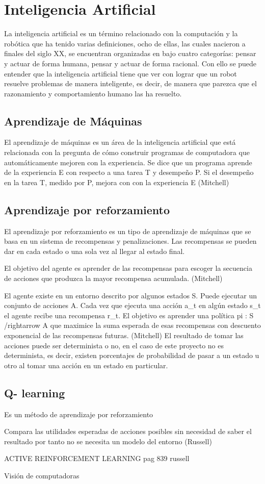 \section{Inteligencia Artificial} \label{sect:Inteligencia_Artificial}
La inteligencia artificial es un término relacionado con la computación y la robótica que ha tenido varias definiciones, ocho de ellas, las cuales nacieron a finales del siglo XX, se encuentran organizadas en \cite{peterNorvig} bajo cuatro categorías: pensar y actuar de forma humana, pensar y actuar de forma racional. Con ello se puede entender que la inteligencia artificial tiene que ver con lograr que un robot resuelve problemas de manera inteligente, es decir, de manera que parezca que el razonamiento y comportamiento humano las ha resuelto.  

\subsection{ Aprendizaje de Máquinas}
El aprendizaje de máquinas es un área de la inteligencia artificial que está relacionada con la pregunta de cómo construir programas de computadora que automáticamente mejoren con la experiencia. Se dice que un programa aprende de la experiencia E con respecto a una tarea T y desempeño P. Si el desempeño en la tarea T, medido por P, mejora con con la experiencia E (Mitchell) 

\subsection{Aprendizaje por reforzamiento}
El aprendizaje por reforzamiento es un tipo de aprendizaje de máquinas que se basa en un sistema de recompensas y penalizaciones. Las recompensas se pueden dar en cada estado o una sola vez al llegar al estado final.

El objetivo del agente es aprender de las recompensas para escoger la secuencia de acciones que produzca la mayor recompensa acumulada. (Mitchell) 

El agente existe en un entorno descrito por algunos estados S. Puede ejecutar un conjunto de acciones A. Cada vez que ejecuta una acción a_{t} en algún estado s_{t} el agente recibe una recompensa r_{t}. El objetivo es aprender una política pi : S /rightarrow A que maximice la suma esperada de esas recompensas con descuento exponencial de las recompensas futuras. (Mitchell) El resultado de tomar las acciones puede ser determinista o no, en el caso de este proyecto no es determinista, es decir, existen porcentajes de probabilidad de pasar a un estado u otro al tomar una acción en un estado en particular.  

\subsection{ Q- learning}

Es un método de aprendizaje por reforzamiento

Compara las utilidades esperadas de acciones posibles sin necesidad de saber el resultado por tanto no se necesita un modelo del entorno (Russell) 

ACTIVE REINFORCEMENT LEARNING pag 839 russell 

Visión de computadoras

